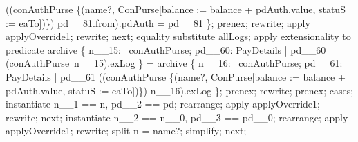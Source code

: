 \begin{LPScript}
\begin{zproof}[lPromotedAuxWorldValType]
                \land ((conAuthPurse \oplus \{(name?, \theta ConPurse[balance :=
                balance + pdAuth.value, statuS := eaTo])\})
                pd\_\_81.from).pdAuth = pd\_\_81 \};
        prenex;
        rewrite;
        apply applyOverride1;
        rewrite;
    next;
        equality substitute allLogs;
        apply extensionality to predicate
            archive \cup \{ n\_\_15: \dom~conAuthPurse; pd\_\_60: PayDetails
                | pd\_\_60 \in (conAuthPurse~n\_\_15).exLog \}
            = archive \cup \{ n\_\_16: \dom~conAuthPurse; pd\_\_61: PayDetails
                | pd\_\_61 \in ((conAuthPurse \oplus \{(name?, \theta ConPurse[balance :=
                balance + pdAuth.value, statuS := eaTo])\}) n\_\_16).exLog \};
        prenex;
        rewrite;
        prenex;
        cases;
            instantiate n\_\_1 == n, pd\_\_2 == pd;
            rearrange;
            apply applyOverride1;
            rewrite;
        next;
            instantiate n\_\_2 == n\_\_0, pd\_\_3 == pd\_\_0;
            rearrange;
            apply applyOverride1;
            rewrite;
            split \lnot n = name?;
            simplify;
    next;
\end{zproof}\end{LPScript}


